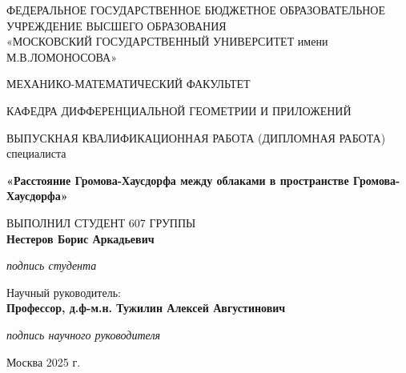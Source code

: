 
\begin{center}
  \small
  ФЕДЕРАЛЬНОЕ ГОСУДАРСТВЕННОЕ БЮДЖЕТНОЕ ОБРАЗОВАТЕЛЬНОЕ УЧРЕЖДЕНИЕ
  ВЫСШЕГО ОБРАЗОВАНИЯ\\
  «МОСКОВСКИЙ ГОСУДАРСТВЕННЫЙ УНИВЕРСИТЕТ имени М.В.ЛОМОНОСОВА»

  \vspace{1.5cm}

  МЕХАНИКО-МАТЕМАТИЧЕСКИЙ ФАКУЛЬТЕТ

  \vspace{0.5cm}

  КАФЕДРА ДИФФЕРЕНЦИАЛЬНОЙ ГЕОМЕТРИИ И ПРИЛОЖЕНИЙ

  \vspace{2cm}

  \normalsize
  ВЫПУСКНАЯ КВАЛИФИКАЦИОННАЯ РАБОТА (ДИПЛОМНАЯ РАБОТА) специалиста

  \vspace{1cm}

  \Large
  \textbf{«Расстояние Громова-Хаусдорфа между облаками в пространстве
  Громова-Хаусдорфа»}
\end{center}

\vspace{2cm}

\begin{flushright}
  \normalsize
  ВЫПОЛНИЛ СТУДЕНТ 607 ГРУППЫ\\
  \textbf{Нестеров Борис Аркадьевич}

  \vspace{0.5cm}
  \textit{подпись студента}

  \vspace{1cm}

  Научный руководитель:\\
  \textbf{Профессор, д.ф-м.н. Тужилин Алексей Августинович}

  \vspace{0.5cm}
  \textit{подпись научного руководителя}
\end{flushright}

\vfill

\begin{center}
  \normalsize
  Москва 2025 г.
\end{center}
